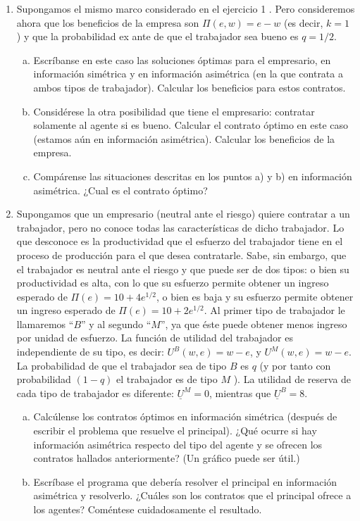 \documentclass[10pt,a4paper]{article}
\begin{document}
\begin{enumerate}
	\item Supongamos el mismo marco considerado en el ejercicio 1 . Pero consideremos ahora que los beneficios de la empresa son $\Pi(e, w)=e-w$ (es decir, $k=1$ ) y que la probabilidad ex ante de que el trabajador sea bueno es $q=1/2$.
	\begin{enumerate}[a)]
		\item Escríbanse en este caso las soluciones óptimas para el empresario, en información simétrica y en información asimétrica (en la que contrata a ambos tipos de trabajador). Calcular los beneficios para estos contratos.		
		\item Considérese la otra posibilidad que tiene el empresario: contratar solamente al agente si es bueno. Calcular el contrato óptimo en este caso (estamos aún en información asimétrica). Calcular los beneficios de la empresa.		
		\item Compárense las situaciones descritas en los puntos a) y b) en información asimétrica. ¿Cual es el contrato óptimo?		
	\end{enumerate}
	\item Supongamos que un empresario (neutral ante el riesgo) quiere contratar a un trabajador, pero no conoce todas las características de dicho trabajador. Lo que desconoce es la productividad que el esfuerzo del trabajador tiene en el proceso de producción para el que desea contratarle. Sabe, sin embargo, que el trabajador es neutral ante el riesgo y que puede ser de dos tipos: o bien su productividad es alta, con lo que su esfuerzo permite obtener un ingreso esperado de $\Pi(e)=10+4 e^{1/2}$, o bien es baja y su esfuerzo permite obtener un ingreso esperado de $\Pi(e)=10+2 e^{1/2}$. Al primer tipo de trabajador le llamaremos ``$B$'' y al segundo ``$M$'', ya que éste puede obtener menos ingreso por unidad de esfuerzo. La función de utilidad del trabajador es independiente de su tipo, es decir: $U^{B}(w, e)=w-e$, y $U^{M}(w, e)=w-e$. La probabilidad de que el trabajador sea de tipo $B$ es $q$ (y por tanto con probabilidad $(1-q)$ el trabajador es de tipo $M$ ). La utilidad de reserva de cada tipo de trabajador es diferente: $\underline{U}^{M}=0$, mientras que $\underline{U}^{B}=8$.
	\begin{enumerate}[a)]
		\item  Calcúlense los contratos óptimos en información simétrica (después de escribir el problema que resuelve el principal). ¿Qué ocurre si hay información asimétrica respecto del tipo del agente y se ofrecen los contratos hallados anteriormente? (Un gráfico puede ser útil.)
		\item  Escríbase el programa que debería resolver el principal en información asimétrica y resolverlo. ¿Cuáles son los contratos que el principal ofrece a los agentes? Coméntese cuidadosamente el resultado.
	\end{enumerate}
\end{enumerate}
\end{document}
